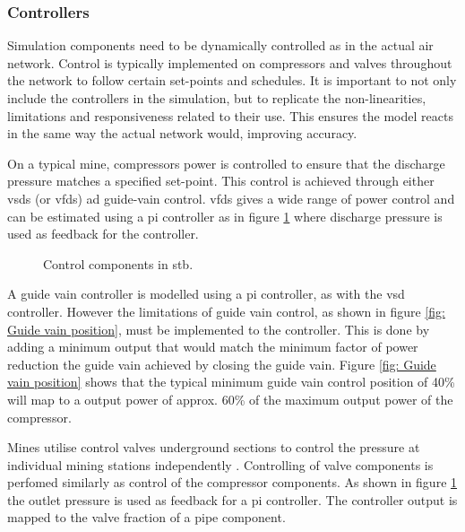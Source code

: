 		\subsubsection{Controllers}\label{Controllers}
		Simulation components need to be dynamically controlled as in the actual air network. Control is typically implemented on compressors and valves throughout the network to follow certain set-points and schedules. It is important to not only include the controllers in the simulation, but to replicate the non-linearities, limitations and responsiveness related to their use. This ensures the model reacts in the same way the actual network would, improving accuracy.
		\par 
		On a typical mine, compressors power is controlled to ensure that the discharge pressure matches a specified set-point. This control is achieved through either \glspl{vsd} (or \glspl{vfd}) ad guide-vain control. \glspl{vfd} gives a wide range of power control and can be estimated using a \gls{pi} controller as in figure \ref{fig: Controller models} where discharge pressure is used as feedback for the controller. 
	\begin{figure}[h]
		\centering
		\caption{Control components in \gls{stb}.}
		\label{fig: Controller models}
	\end{figure}
		A guide vain controller is modelled using a \gls{pi} controller, as with the \gls{vsd} controller. However the limitations of guide vain control, as shown in figure \ref{fig: Guide vain position}, must be implemented to the controller. This is done by adding a minimum output that would match the minimum factor of power reduction the guide vain achieved by closing the guide vain. Figure \ref{fig: Guide vain position} shows that the typical minimum guide vain control position of 40\% will map to a output power of approx. 60\% of the maximum output power of the compressor. 
		\par 
		Mines utilise control valves underground sections to control the pressure at individual mining stations independently \cite{Heyns2014Masters}. Controlling of valve components is perfomed similarly as control of the compressor components. As shown in figure \ref{fig: Controller models} the outlet pressure is used as feedback for a pi controller. The controller output is mapped to the valve fraction of a pipe component.
